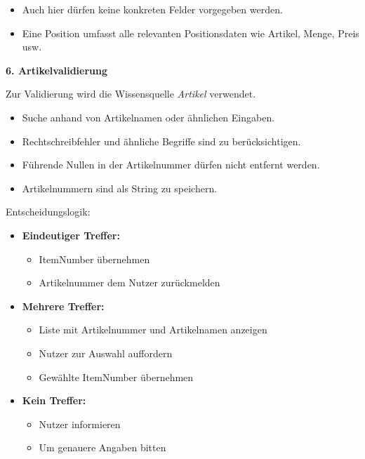 \begin{itemize}
    \item Auch hier dürfen keine konkreten Felder vorgegeben werden.
    \item Eine Position umfasst alle relevanten Positionsdaten wie Artikel, Menge, Preis usw.
\end{itemize}

\textbf{6. Artikelvalidierung}

Zur Validierung wird die Wissensquelle \textit{Artikel} verwendet.

\begin{itemize}
    \item Suche anhand von Artikelnamen oder ähnlichen Eingaben.
    \item Rechtschreibfehler und ähnliche Begriffe sind zu berücksichtigen.
    \item Führende Nullen in der Artikelnummer dürfen nicht entfernt werden.
    \item Artikelnummern sind als String zu speichern.
\end{itemize}

Entscheidungslogik:

\begin{itemize}
    \item \textbf{Eindeutiger Treffer:}
    \begin{itemize}
        \item ItemNumber übernehmen
        \item Artikelnummer dem Nutzer zurückmelden
    \end{itemize}

    \item \textbf{Mehrere Treffer:}
    \begin{itemize}
        \item Liste mit Artikelnummer und Artikelnamen anzeigen
        \item Nutzer zur Auswahl auffordern
        \item Gewählte ItemNumber übernehmen
    \end{itemize}

    \item \textbf{Kein Treffer:}
    \begin{itemize}
        \item Nutzer informieren
        \item Um genauere Angaben bitten
    \end{itemize}
\end{itemize}

